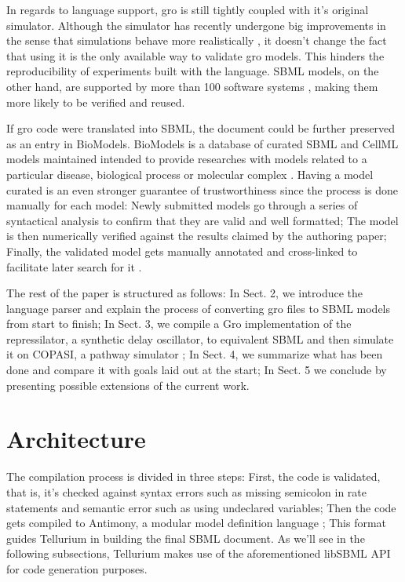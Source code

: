 \documentclass[12pt]{article}
\begin{document}
    In regards to language support, gro is still tightly coupled with it's original simulator. Although the simulator has recently undergone big improvements in the sense that simulations behave more realistically \cite{Gutirrez2017}, it doesn't change the fact that using it is the only available way to validate gro models. This hinders the reproducibility of experiments built with the language. SBML models, on the other hand, are supported by more than 100 software systems \cite{Hucka2007}, making them more likely to be verified and reused.
    
    If gro code were translated into SBML, the document could be further preserved as an entry in BioModels. BioModels is a database of curated SBML and CellML models maintained intended to provide researches with models related to a particular disease, biological process or molecular complex \cite{LeNovere2006}. Having a model curated is an even stronger guarantee of trustworthiness since the process is done manually for each model: Newly submitted models go through a series of syntactical analysis to confirm that they are valid and well formatted; The model is then numerically verified against the results claimed by the authoring paper; Finally, the validated model gets manually annotated and cross-linked to facilitate later search for it \cite{LeNovere2006}.
    
    The rest of the paper is structured as follows: In Sect. 2, we introduce the language parser and explain the process of converting gro files to SBML models from start to finish; In Sect. 3, we compile a Gro implementation of the repressilator, a synthetic delay oscillator, to equivalent SBML and then simulate it on COPASI, a pathway simulator \cite{Hoops2006}; In Sect. 4, we summarize what has been done and compare it with goals laid out at the start; In Sect. 5 we conclude by presenting possible extensions of the current work.
    

\section{Architecture}

    
    The compilation process is divided in three steps: First, the code is validated, that is, it's checked against syntax errors such as missing semicolon in rate statements and semantic error such as using undeclared variables; Then the code gets compiled to Antimony, a modular model definition language \cite{Smith2009}; This format guides Tellurium in building the final SBML document. As we'll see in the following subsections, Tellurium makes use of the aforementioned libSBML API for code generation purposes.
\end{document}
